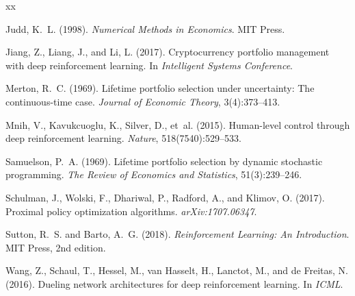 \documentclass[11pt,a4paper]{article}
\begin{document}

\begin{thebibliography}{xx}

Judd, K.~L. (1998).
\newblock \emph{Numerical Methods in Economics}.
\newblock MIT Press.

Jiang, Z., Liang, J., and Li, L. (2017).
\newblock Cryptocurrency portfolio management with deep reinforcement learning.
\newblock In \emph{Intelligent Systems Conference}.

Merton, R.~C. (1969).
\newblock Lifetime portfolio selection under uncertainty: The continuous-time case.
\newblock \emph{Journal of Economic Theory}, 3(4):373--413.

Mnih, V., Kavukcuoglu, K., Silver, D., et~al. (2015).
\newblock Human-level control through deep reinforcement learning.
\newblock \emph{Nature}, 518(7540):529--533.

Samuelson, P.~A. (1969).
\newblock Lifetime portfolio selection by dynamic stochastic programming.
\newblock \emph{The Review of Economics and Statistics}, 51(3):239--246.

Schulman, J., Wolski, F., Dhariwal, P., Radford, A., and Klimov, O. (2017).
\newblock Proximal policy optimization algorithms.
\newblock \emph{arXiv:1707.06347}.

Sutton, R.~S. and Barto, A.~G. (2018).
\newblock \emph{Reinforcement Learning: An Introduction}.
\newblock MIT Press, 2nd edition.

Wang, Z., Schaul, T., Hessel, M., van Hasselt, H., Lanctot, M., and de Freitas, N. (2016).
\newblock Dueling network architectures for deep reinforcement learning.
\newblock In \emph{ICML}.


\end{thebibliography}
\end{document}
